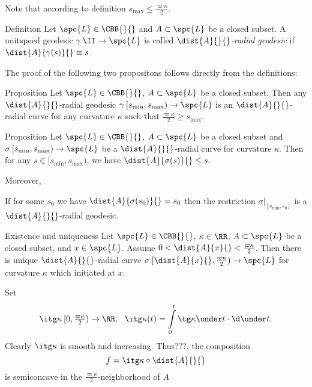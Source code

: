 Note that according to definition $s_{\max}\le\tfrac{\varpi\kappa}2$.

\begin{thm}{Definition}\label{def:rad-geod}
Let $\spc{L}\in\CBB{}{}$
and $A\subset \spc{L}$ be a closed subset.
A unitspeed geodesic  $\gamma\:\II\to \spc{L}$  is called 
\emph{$\dist{A}{}{}$-radial geodesic} if 
$\dist{A}{\gamma(s)}{}\equiv s$.
\end{thm}

The proof of the following two propositons follows directly from the definitions: 

\begin{thm}{Proposition}
Let $\spc{L}\in\CBB{}{}$,
$A\subset\spc{L}$ be a closed subset.
Then any $\dist{A}{}{}$-radial geodesic 
$\gamma\:[s_{\min},s_{\max})
\to 
\spc{L}$ 
is an $\dist{A}{}{}$-radial curve for any curvature $\kappa$ such that $\tfrac{\varpi\kappa}{2}
\ge 
s_{\max}$.
\end{thm}

\begin{thm}{Proposition}\label{prop:dist<s}
Let $\spc{L}\in\CBB{}{}$,
$A\subset\spc{L}$ be a closed subset 
and $\sigma\:[s_{\min},s_{\max})\to \spc{L}$ be a $\dist{A}{}{}$-radial curve for curvature $\kappa$.
Then for any $s\in [s_{\min},s_{\max})$, 
we have $\dist{A}{\sigma(s)}{}\le s$.

Moreover, 
\begin{subthm}{}
If for some $s_0$ we have $\dist{A}{\sigma(s_0)}{}= s_0$ 
then the restriction $\sigma|_{[s_{\min},s_0]}$ is a $\dist{A}{}{}$-radial geodesic.
\end{subthm}
\end{thm}

\begin{thm}{Existence and uniqueness}\label{rad-curv-exist}
Let $\spc{L}\in\CBB{}{}$, 
$\kappa\in\RR$, 
$A\subset\spc{L}$ be a closed subset, 
and $x\in \spc{L}$.
Assume
$0
<
\dist{A}{x}{}
<
\tfrac{\varpi\kappa}2$.
Then there is unique $\dist{A}{}{}$-radial curve $\sigma\:[\dist{A}{x}{},\tfrac{\varpi\kappa}2)\to \spc{L}$ 
for curvature $\kappa$
which initiated at $x$.
\end{thm}


Set\index{$\itg\kappa$} 
$$\itg\kappa\:[0,\tfrac{\varpi\kappa}2)\to\RR,
\ \ 
\itg\kappa (t)=\int\limits_0^t\tg\kappa\under t\cdot\d\under t.$$
Clearly $\itg\kappa$ is smooth and increasing.
Thus???, the composition 
$$f=\itg\kappa\circ\dist{A}{}{}$$ 
is semiconcave in the $\tfrac{\varpi\kappa}2$-neighborhood of $A$

